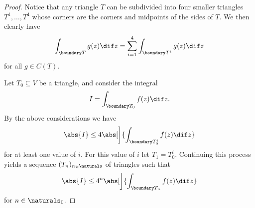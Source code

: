 \documentclass[article, a4paper, 11pt, oneside]{memoir}
\numberwithin{equation}{chapter}
\begin{document}
\begin{proof}
    Notice that any triangle $T$ can be subdivided into four smaller triangles $T^1, \ldots, T^4$ whose corners are the corners and midpoints of the sides of $T$. We then clearly have
    \begin{equation*}
        \int_{\boundary T} g(z) \dif z
            = \sum_{i=1}^4 \int_{\boundary T^i} g(z) \dif z
    \end{equation*}
    for all $g \in C(T)$.

    Let $T_0 \subseteq V$ be a triangle, and consider the integral
    \begin{equation*}
        I
            = \int_{\boundary T_0} f(z) \dif z.
    \end{equation*}
    By the above considerations we have
    \begin{equation*}
        \abs{I}
            \leq 4 \abs[\bigg]{ \int_{\boundary T_0^i} f(z) \dif z }
    \end{equation*}
    for at least one value of $i$. For this value of $i$ let $T_1 = T_0^i$. Continuing this process yields a sequence $(T_n)_{n\in\naturals}$ of triangles such that
    \begin{equation*}
        \abs{I}
            \leq 4^n \abs[\bigg]{ \int_{\boundary T_n} f(z) \dif z }
    \end{equation*}
    for $n \in \naturals_0$.


\end{proof}
\end{document}
